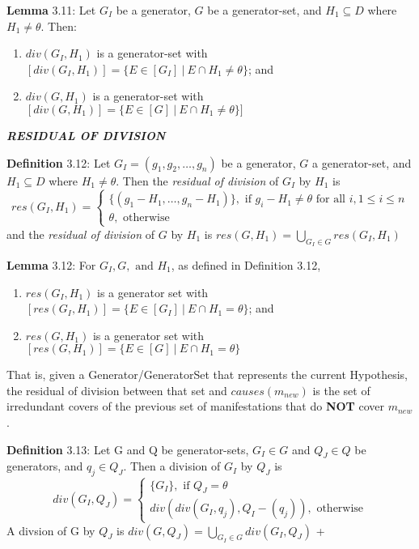 \documentclass{article}
\begin{document}
\par 
\textbf{Lemma} 3.11: Let $G_I$ be a generator, $G$ be a generator-set, and $H_1
\subseteq D$ where $H_1 \neq \theta$. Then:
\begin{enumerate}[label={(\alph*)}]
  \item $div(G_I, H_1)$ is a generator-set with $[div(G_I, H_1)] = \{ E \in
  [G_I] \:|\: E \cap H_1 \neq \theta \}$; and
  \item $div(G, H_1)$ is a generator-set with $[div(G, H_1)] = \{ E \in [G]
  \:|\: E \cap H_1 \neq \theta \}]$\newline
\end{enumerate}
\par
\textit{\textbf{RESIDUAL OF DIVISION}}
\par 
\textbf{Definition} 3.12: Let $G_I = (g_1, g_2, \ldots, g_n)$ be a generator,
$G$ a generator-set, and $H_1 \subseteq D$ where $H_1 \neq \theta$. Then the
\textit{residual of division} of $G_I$ by $H_1$ is 
\[
res(G_I, H_1) =
\begin{cases}
   \{ (g_1 - H_1, \ldots, g_n - H_1) \}, \text{ if } g_i - H_1 \neq \theta
   \text{ for all } i, 1 \leq i \leq n
   \\
   \theta, \text{ otherwise}
\end{cases}
\] 
and the \textit{residual of division} of $G$ by $H_1$ is \newline
$res(G, H_1) = \bigcup\limits_{G_I \in G} res(G_I, H_1)$
\newline

\par 
\textbf{Lemma} 3.12: For $G_I, G, \text{ and } H_1$, as defined in Definition
3.12, 
\begin{enumerate}[label={(\alph*)}]
  \item $res(G_I, H_1)$ is a generator set with $[res(G_I, H_1)] = \{ E \in
  [G_I] \:|\: E \cap H_1 = \theta \}$; and
  \item $res(G, H_1)$ is a generator set with $[res(G, H_1)] = \{ E \in [G]
  \:|\: E \cap H_1 = \theta \}$\newline
\end{enumerate}
\par
That is, given a Generator/GeneratorSet that represents the current Hypothesis,
the residual of division between that set and $causes(m_{new})$ is the set of
irredundant covers of the previous set of manifestations that do \textbf{NOT}
cover $m_{new}$.
\newline
\par 
\textbf{Definition} 3.13: Let G and Q be generator-sets, $G_I \in G$ and $Q_J
\in Q$ be generators, and $q_j \in Q_J$. Then a division of $G_I$ by $Q_J$ is
\[
   div( G_I, Q_J) = 
   \begin{cases}
   \{G_I\}, \text{ if } Q_J = \theta \\
   div( div( G_I, q_j), Q_I - (q_j)), \text{ otherwise}
   \end{cases}
\]
A divsion of G by $Q_J$ is $div(G, Q_J) = \bigcup\limits_{G_I \in G} div( G_I,
Q_J)$ \newline+
\end{document}
